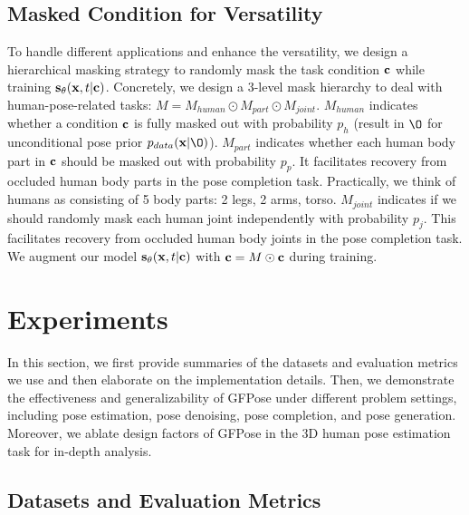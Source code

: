 \documentclass[10pt,twocolumn,letterpaper]{article}
\begin{document}
\subsection{Masked Condition for Versatility}
\label{subsec:mask_condition}
To handle different applications and enhance the versatility, we design a hierarchical masking strategy to randomly mask the task condition $\mathbf{c}$ while training $\mathbf{s}_{\theta}(\mathbf{x}, t | \mathbf{c})$.
Concretely, we design a 3-level mask hierarchy to deal with human-pose-related tasks: $ M = M_{human} \odot M_{part} \odot M_{joint} $. $M_{human}$ indicates whether a condition $\mathbf{c}$ is fully masked out with probability $p_h$ (result in $\O$ for unconditional pose prior $\data(\pose|\O)$). $M_{part}$ indicates whether each human body part in $\mathbf{c}$ should be masked out with probability $p_{p}$. It facilitates recovery from occluded human body parts in the pose completion task. Practically, we think of humans as consisting of 5 body parts: 2 legs, 2 arms, torso. $M_{joint}$ indicates if we should randomly mask each human joint independently with probability $p_{j}$. This facilitates recovery from occluded human body joints in the pose completion task. We augment our model $\mathbf{s}_{\theta}(\mathbf{x}, t | \mathbf{c})$ with $\mathbf{c} = M \odot \mathbf{c}$ during training. 









 

\section{Experiments}
\label{sec:experiments}
In this section, we first provide summaries of the datasets and evaluation metrics we use and then elaborate on the implementation details. 
Then, we demonstrate the effectiveness and generalizability of GFPose under different problem settings, including pose estimation, pose denoising, pose completion, and pose generation.
Moreover, we ablate design factors of GFPose in the 3D human pose estimation task for in-depth analysis.


\subsection{Datasets and Evaluation Metrics}
\label{subsec:dataset_metric}
\end{document}
